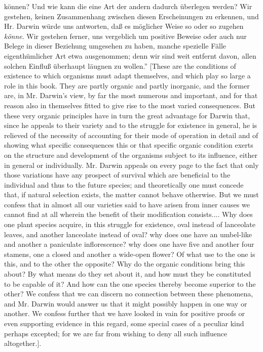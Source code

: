 \documentclass[12pt,a4paper]{book}
\begin{document}
{können? Und wie kann die eine Art der andern dadurch überlegen werden? Wir
gestehen, keinen Zusammenhang zwischen diesen Erscheinungen zu erkennen, und Hr.
Darwin würde uns antworten, daß es möglicher Weise so oder so zugehen
\emph{könne}. Wir gestehen ferner, uns vergeblich um positive Beweise oder auch
nur Belege in dieser Beziehung umgesehen zu haben, manche spezielle Fälle
eigenthümlicher Art etwa ausgenommen; denn wir sind weit entfernt davon, allen
solchen Einfluß überhaupt läugnen zu wollen.'' [These are the conditions of
existence to which organisms must adapt themselves, and which play so large a role
in this book. They are partly organic and partly inorganic, and the former are, in
Mr. Darwin's view, by far the most numerous and important, and for that reason
also in themselves fitted to give rise to the most varied consequences. But these
very organic principles have in turn the great advantage for Darwin that, since he
appeals to their variety and to the struggle for existence in general, he is
relieved of the necessity of accounting for their mode of operation in detail and
of showing what specific consequences this or that specific organic condition
exerts on the structure and development of the organisms subject to its influence,
either in general or individually. Mr. Darwin appeals on every page to the fact
that only those variations have any prospect of survival which are beneficial to
the individual and thus to the future species; and theoretically one must concede
that, if natural selection exists, the matter cannot behave otherwise. But we must
confess that in almost all our varieties said to have arisen from inner causes we
cannot find at all wherein the benefit of their modification consists.... Why does
one plant species acquire, in this struggle for existence, oval instead of
lanceolate leaves, and another lanceolate instead of oval? why does one have an
umbel-like and another a paniculate inflorescence? why does one have five and
another four stamens, one a closed and another a wide-open flower? Of what use to
the one is this, and to the other the opposite? Why do the organic conditions bring
this about? By what means do they set about it, and how must they be constituted to
be capable of it? And how can the one species thereby become superior to the other?
We confess that we can discern no connection between these phenomena, and Mr.
Darwin would answer us that it might possibly happen in one way or another. We
confess further that we have looked in vain for positive proofs or even supporting
evidence in this regard, some special cases of a peculiar kind perhaps excepted;
for we are far from wishing to deny all such influence altogether.]}.
\end{document}
